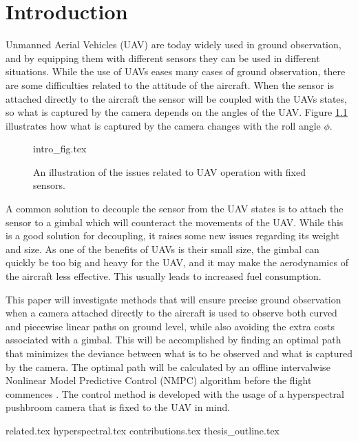 \chapter{Introduction}

Unmanned Aerial Vehicles (UAV) are today widely used in ground observation, and by equipping them with different sensors they can be used in different situations. While the use of UAVs eases many cases of ground observation, there are some difficulties related to the attitude of the aircraft. When the sensor is attached directly to the aircraft the sensor will be coupled with the UAVs states, so what is captured by the camera depends on the angles of the UAV. Figure \ref{fig:intro_fig} illustrates how what is captured by the camera changes with the roll angle $\phi$.

\begin{figure}
	{intro_fig.tex}
	\caption{An illustration of the issues related to UAV operation with fixed sensors.}
	\label{fig:intro_fig}
\end{figure}

A common solution to decouple the sensor from the UAV states is to attach the sensor to a gimbal which will counteract the movements of the UAV. While this is a good solution for decoupling, it raises some new issues regarding its weight and size. As one of the benefits of UAVs is their small size, the gimbal can quickly be too big and heavy for the UAV, and it may make the aerodynamics of the aircraft less effective. This usually leads to increased fuel consumption.

This paper will investigate methods that will ensure precise ground observation when a camera attached directly to the aircraft is used to observe both curved and piecewise linear paths on ground level, while also avoiding the extra costs associated with a gimbal. This will be accomplished by finding an optimal path that minimizes the deviance between what is to be observed and what is captured by the camera. The optimal path will be calculated by an offline intervalwise Nonlinear Model Predictive Control (NMPC) algorithm before the flight commences \cite{rhcKWON}. The control method is developed with the usage of a hyperspectral pushbroom camera that is fixed to the UAV in mind.

{related.tex}
{hyperspectral.tex}
{contributions.tex}
{thesis_outline.tex}